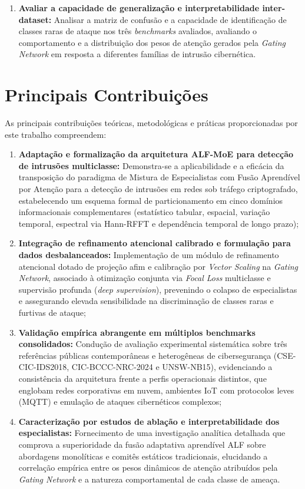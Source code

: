 \begin{enumerate}
    \item \textbf{Avaliar a capacidade de generalização e interpretabilidade inter-dataset:} Analisar a matriz de confusão e a capacidade de identificação de classes raras de ataque nos três \emph{benchmarks} avaliados, avaliando o comportamento e a distribuição dos pesos de atenção gerados pela \emph{Gating Network} em resposta a diferentes famílias de intrusão cibernética.
\end{enumerate}

\section{Principais Contribuições}
\label{sec:contribuicoes}

As principais contribuições teóricas, metodológicas e práticas proporcionadas por este trabalho compreendem:
\begin{enumerate}
    \item \textbf{Adaptação e formalização da arquitetura ALF-MoE para detecção de intrusões multiclasse:} Demonstra-se a aplicabilidade e a eficácia da transposição do paradigma de Mistura de Especialistas com Fusão Aprendível por Atenção para a detecção de intrusões em redes sob tráfego criptografado, estabelecendo um esquema formal de particionamento em cinco domínios informacionais complementares (estatístico tabular, espacial, variação temporal, espectral via Hann-RFFT e dependência temporal de longo prazo);
    \item \textbf{Integração de refinamento atencional calibrado e formulação para dados desbalanceados:} Implementação de um módulo de refinamento atencional dotado de projeção afim e calibração por \emph{Vector Scaling} na \emph{Gating Network}, associado à otimização conjunta via \emph{Focal Loss} multiclasse e supervisão profunda (\emph{deep supervision}), prevenindo o colapso de especialistas e assegurando elevada sensibilidade na discriminação de classes raras e furtivas de ataque;
    \item \textbf{Validação empírica abrangente em múltiplos benchmarks consolidados:} Condução de avaliação experimental sistemática sobre três referências públicas contemporâneas e heterogêneas de cibersegurança (CSE-CIC-IDS2018, CIC-BCCC-NRC-2024 e UNSW-NB15), evidenciando a consistência da arquitetura frente a perfis operacionais distintos, que englobam redes corporativas em nuvem, ambientes IoT com protocolos leves (MQTT) e emulação de ataques cibernéticos complexos;
    \item \textbf{Caracterização por estudos de ablação e interpretabilidade dos especialistas:} Fornecimento de uma investigação analítica detalhada que comprova a superioridade da fusão adaptativa aprendível ALF sobre abordagens monolíticas e comitês estáticos tradicionais, elucidando a correlação empírica entre os pesos dinâmicos de atenção atribuídos pela \emph{Gating Network} e a natureza comportamental de cada classe de ameaça.
\end{enumerate}

